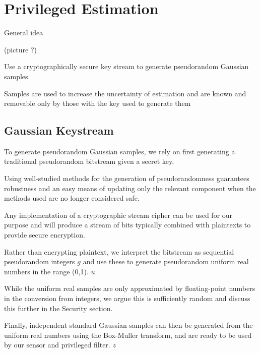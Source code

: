 \documentclass[conference]{IEEEtran}
\theoremstyle{definition}
\theoremstyle{definition}
\theoremstyle{remark}
\begin{document}
\section{Privileged Estimation}\label{sec:priv_estimation}
General idea

(picture ?)

Use a cryptographically secure key stream to generate pseudorandom Gaussian samples

Samples are used to increase the uncertainty of estimation and are known and removable only by those with the key used to generate them

% 
% 

\subsection{Gaussian Keystream}
To generate pseudorandom Gaussian samples, we rely on first generating a traditional pseudorandom bitstream given a secret key.

Using well-studied methods for the generation of pseudorandomness guarantees robustness and an easy means of updating only the relevant component when the methods used are no longer considered safe.

Any implementation of a cryptographic stream cipher can be used for our purpose and will produce a stream of bits typically combined with plaintexts to provide secure encryption.

Rather than encrypting plaintext, we interpret the bitstream as sequential pseudorandom integers $g$ and use these to generate pseudorandom uniform real numbers in the range (0,1). $u$

While the uniform real samples are only approximated by floating-point numbers in the conversion from integers, we argue this is sufficiently random and discuss this further in the Security section.

Finally, independent standard Gaussian samples can then be generated from the uniform real numbers using the Box-Muller transform, and are ready to be used by our sensor and privileged filter. $z$
\end{document}
